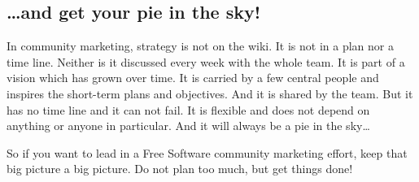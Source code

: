 \subsection*{\dots and get your pie in the sky!}
In community marketing, strategy is not on the wiki. It is not in a plan nor a
time line. Neither is it discussed every week with the whole team. It is part of
a vision which has grown over time. It is carried by a few central people and
inspires the short-term plans and objectives. And it is shared by the team. But
it has no time line and it can not fail. It is flexible and does not depend on
anything or anyone in particular. And it will always be a pie in the sky\dots

So if you want to lead in a Free Software community marketing effort, keep that
big picture a big picture. Do not plan too much, but get things done!

